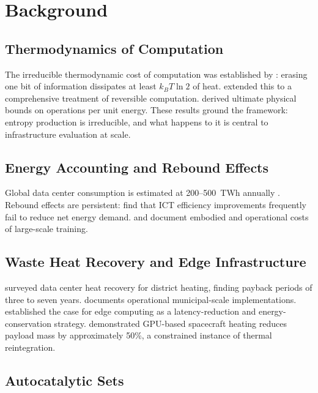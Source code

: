 \documentclass[10pt,twocolumn]{article}
\theoremstyle{plain}
\theoremstyle{definition}
\theoremstyle{remark}
\begin{document}
\section{Background}

\subsection{Thermodynamics of Computation}

The irreducible thermodynamic cost of computation was established by
\citet{landauer1961}: erasing one bit of information dissipates at
least $k_B T \ln 2$ of heat. \citet{bennett1982} extended this to a
comprehensive treatment of reversible computation. \citet{lloyd2000}
derived ultimate physical bounds on operations per unit energy.
These results ground the framework: entropy production is irreducible,
and what happens to it is central to infrastructure evaluation at scale.

\subsection{Energy Accounting and Rebound Effects}

Global data center consumption is estimated at 200--500~TWh annually
\citep{shehabi2016,masanet2020,iea2024}. Rebound effects
\citep{jevons1865,sorrell2009} are persistent: \citet{jones2021} find
that ICT efficiency improvements frequently fail to reduce net energy
demand. \citet{strubell2019} and \citet{gao2022} document embodied
and operational costs of large-scale training.

\subsection{Waste Heat Recovery and Edge Infrastructure}

\citet{rambo2014} surveyed data center heat recovery for district
heating, finding payback periods of three to seven years.
\citet{stockholm2020} documents operational municipal-scale
implementations. \citet{satyanarayanan2017} established the case for
edge computing as a latency-reduction and energy-conservation strategy.
\citet{yuan2024} demonstrated GPU-based spacecraft heating reduces
payload mass by approximately 50\%, a constrained instance of thermal
reintegration.

\subsection{Autocatalytic Sets}
\end{document}
